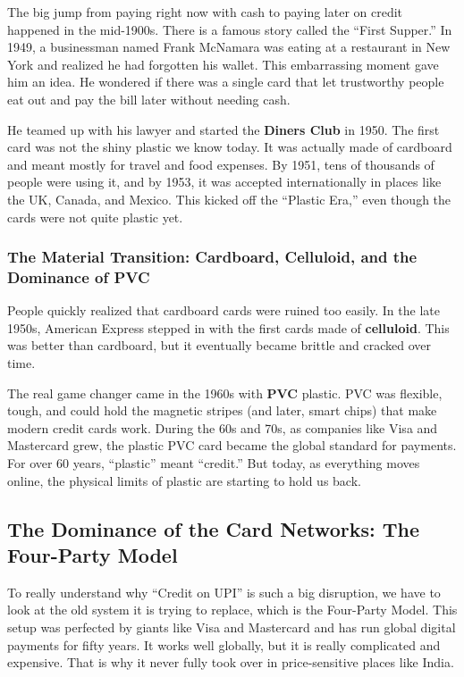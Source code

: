 The big jump from paying right now with cash to paying later on credit happened in the mid-1900s. There is a famous story called the ``First Supper.'' In 1949, a businessman named Frank McNamara was eating at a restaurant in New York and realized he had forgotten his wallet. This embarrassing moment gave him an idea. He wondered if there was a single card that let trustworthy people eat out and pay the bill later without needing cash.

He teamed up with his lawyer and started the \textbf{Diners Club} in 1950. The first card was not the shiny plastic we know today. It was actually made of cardboard and meant mostly for travel and food expenses. By 1951, tens of thousands of people were using it, and by 1953, it was accepted internationally in places like the UK, Canada, and Mexico. This kicked off the ``Plastic Era,'' even though the cards were not quite plastic yet.

\subsubsection{The Material Transition: Cardboard, Celluloid, and the Dominance of PVC}

People quickly realized that cardboard cards were ruined too easily. In the late 1950s, American Express stepped in with the first cards made of \textbf{celluloid}. This was better than cardboard, but it eventually became brittle and cracked over time.

The real game changer came in the 1960s with \textbf{PVC} plastic. PVC was flexible, tough, and could hold the magnetic stripes (and later, smart chips) that make modern credit cards work. During the 60s and 70s, as companies like Visa and Mastercard grew, the plastic PVC card became the global standard for payments. For over 60 years, ``plastic'' meant ``credit.'' But today, as everything moves online, the physical limits of plastic are starting to hold us back.

\subsection{The Dominance of the Card Networks: The Four-Party Model}

To really understand why ``Credit on UPI'' is such a big disruption, we have to look at the old system it is trying to replace, which is the Four-Party Model. This setup was perfected by giants like Visa and Mastercard and has run global digital payments for fifty years. It works well globally, but it is really complicated and expensive. That is why it never fully took over in price-sensitive places like India.

